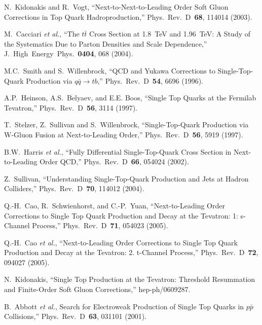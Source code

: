 \documentclass[aps]{revtex4}
\newcommand{\rar}       {\rightarrow}
\newcommand{\tbbar}     {\mbox{$tb$}}
\newcommand{\ttbar}     {\mbox{$t\bar{t}$}}
\newcommand{\qqbar}     {\mbox{$q\bar{q}$}}
\newcommand{\ppbar}     {\mbox{$p\bar{p}$}}
\begin{document}
\begin{thebibliography}{99.}
\label{bibliography}

\vspace{-0.15in}

N.~Kidonakis and R.~Vogt,
``Next-to-Next-to-Leading Order Soft Gluon Corrections in Top Quark
Hadroproduction,''
Phys.\ Rev.\ D~{\bf 68}, 114014 (2003).

M.~Cacciari {\it et al.},
``The {\ttbar} Cross Section at 1.8~TeV and 1.96~TeV: A Study of
the Systematics Due to Parton Densities and Scale Dependence,''
J.\ High~Energy~Phys.~{\bf 0404}, 068 (2004).

M.C.~Smith and S.~Willenbrock,
``QCD and Yukawa Corrections to Single-Top-Quark Production
via ${\qqbar}{\rar}{\tbbar}$,''
Phys.\ Rev.\ D~{\bf 54}, 6696 (1996).

A.P.~Heinson, A.S.~Belyaev, and E.E. Boos,
``Single Top Quarks at the Fermilab Tevatron,''
Phys.\ Rev.\ D~{\bf 56}, 3114 (1997).

T.~Stelzer, Z.~Sullivan and S.~Willenbrock,
``Single-Top-Quark Production via W-Gluon Fusion at
Next-to-Leading Order,''
Phys.\ Rev.\ D~{\bf 56}, 5919 (1997).

B.W.~Harris {\it et al.},
``Fully Differential Single-Top-Quark Cross Section in Next-to-Leading
Order QCD,''
Phys.\ Rev.\ D~{\bf 66}, 054024 (2002).

Z.~Sullivan,
``Understanding Single-Top-Quark Production and Jets at Hadron
Colliders,''
Phys.\ Rev.\ D~{\bf 70}, 114012 (2004).

Q.-H.~Cao, R.~Schwienhorst, and C.-P.~Yuan,
``Next-to-Leading Order Corrections to Single Top Quark Production
and Decay at the Tevatron: 1: s-Channel Process,''
Phys.\ Rev.\ D~{\bf 71}, 054023 (2005).

Q.-H.~Cao {\it et al.},
``Next-to-Leading Order Corrections to Single Top Quark Production
and Decay at the Tevatron: 2. t-Channel Process,''
Phys.\ Rev.\ D~{\bf 72}, 094027 (2005).

N.~Kidonakis,
``Single Top Production at the Tevatron: Threshold Resummation and
Finite-Order Soft Gluon Corrections,''
hep-ph/0609287.

B.~Abbott {\it et al.},
Search for Electroweak Production of Single Top Quarks in {\ppbar}
Collisions,''
Phys.\ Rev.\ D~{\bf 63}, 031101 (2001).


\end{thebibliography}
\end{document}
